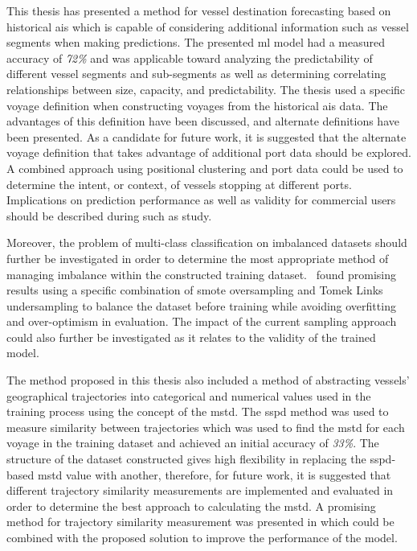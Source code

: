 This thesis has presented a method for vessel destination forecasting based on historical \acrshort{ais} which is capable of considering additional information such as vessel segments when making predictions. The presented \acrfull{ml} model had a measured accuracy of \textit{72\%} and was applicable toward analyzing the predictability of different vessel segments and sub-segments as well as determining correlating relationships between size, capacity, and predictability. The thesis used a specific voyage definition when constructing voyages from the historical \acrshort{ais} data. The advantages of this definition have been discussed, and alternate definitions have been presented. As a candidate for future work, it is suggested that the alternate voyage definition that takes advantage of additional port data should be explored. A combined approach using positional clustering and port data could be used to determine the intent, or context, of vessels stopping at different ports. Implications on prediction performance as well as validity for commercial users should be described during such as study.

Moreover, the problem of multi-class classification on imbalanced datasets should further be investigated in order to determine the most appropriate method of managing imbalance within the constructed training dataset.~\cite{cv_imbalance} found promising results using a specific combination of \acrshort{smote} oversampling and Tomek Links undersampling to balance the dataset before training while avoiding overfitting and over-optimism in evaluation. The impact of the current sampling approach could also further be investigated as it relates to the validity of the trained model.

The method proposed in this thesis also included a method of abstracting vessels' geographical trajectories into categorical and numerical values used in the training process using the concept of the \acrfull{mstd}. The \acrfull{sspd} method was used to measure similarity between trajectories which was used to find the \acrshort{mstd} for each voyage in the training dataset and achieved an initial accuracy of \textit{33\%}. The structure of the dataset constructed gives high flexibility in replacing the \acrshort{sspd}-based \acrshort{mstd} value with another, therefore, for future work, it is suggested that different trajectory similarity measurements are implemented and evaluated in order to determine the best approach to calculating the \acrshort{mstd}. A promising method for trajectory similarity measurement was presented in \cite{Zhang2020AISApproach} which could be combined with the proposed solution to improve the performance of the model.

